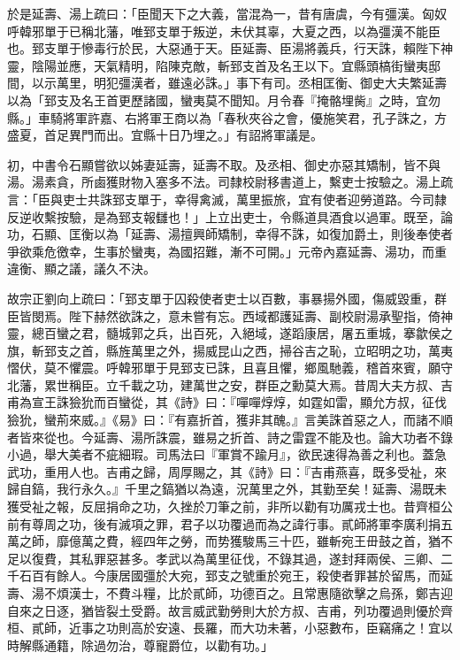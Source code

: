\begin{pinyinscope}
於是延壽、湯上疏曰：「臣聞天下之大義，當混為一，昔有唐虞，今有彊漢。匈奴呼韓邪單于已稱北藩，唯郅支單于叛逆，未伏其辜，大夏之西，以為彊漢不能臣也。郅支單于慘毒行於民，大惡通于天。臣延壽、臣湯將義兵，行天誅，賴陛下神靈，陰陽並應，天氣精明，陷陳克敵，斬郅支首及名王以下。宜縣頭槁街蠻夷邸間，以示萬里，明犯彊漢者，雖遠必誅。」事下有司。丞相匡衡、御史大夫繁延壽以為「郅支及名王首更歷諸國，蠻夷莫不聞知。月令春『掩骼埋胔』之時，宜勿縣。」車騎將軍許嘉、右將軍王商以為「春秋夾谷之會，優施笑君，孔子誅之，方盛夏，首足異門而出。宜縣十日乃埋之。」有詔將軍議是。

初，中書令石顯嘗欲以姊妻延壽，延壽不取。及丞相、御史亦惡其矯制，皆不與湯。湯素貪，所鹵獲財物入塞多不法。司隸校尉移書道上，繫吏士按驗之。湯上疏言：「臣與吏士共誅郅支單于，幸得禽滅，萬里振旅，宜有使者迎勞道路。今司隸反逆收繫按驗，是為郅支報讎也！」上立出吏士，令縣道具酒食以過軍。既至，論功，石顯、匡衡以為「延壽、湯擅興師矯制，幸得不誅，如復加爵土，則後奉使者爭欲乘危徼幸，生事於蠻夷，為國招難，漸不可開。」元帝內嘉延壽、湯功，而重違衡、顯之議，議久不決。

故宗正劉向上疏曰：「郅支單于囚殺使者吏士以百數，事暴揚外國，傷威毀重，群臣皆閔焉。陛下赫然欲誅之，意未嘗有忘。西域都護延壽、副校尉湯承聖指，倚神靈，總百蠻之君，髓城郭之兵，出百死，入絕域，遂蹈康居，屠五重城，搴歙侯之旗，斬郅支之首，縣旌萬里之外，揚威昆山之西，掃谷吉之恥，立昭明之功，萬夷慴伏，莫不懼震。呼韓邪單于見郅支已誅，且喜且懼，鄉風馳義，稽首來賓，願守北藩，累世稱臣。立千載之功，建萬世之安，群臣之勳莫大焉。昔周大夫方叔、吉甫為宣王誅獫狁而百蠻從，其《詩》曰：『嘽嘽焞焞，如霆如雷，顯允方叔，征伐獫狁，蠻荊來威。』《易》曰：『有嘉折首，獲非其醜。』言美誅首惡之人，而諸不順者皆來從也。今延壽、湯所誅震，雖易之折首、詩之雷霆不能及也。論大功者不錄小過，舉大美者不疵細瑕。司馬法曰『軍賞不踰月』，欲民速得為善之利也。蓋急武功，重用人也。吉甫之歸，周厚賜之，其《詩》曰：『吉甫燕喜，既多受祉，來歸自鎬，我行永久。』千里之鎬猶以為遠，況萬里之外，其勤至矣！延壽、湯既未獲受祉之報，反屈捐命之功，久挫於刀筆之前，非所以勸有功厲戎士也。昔齊桓公前有尊周之功，後有滅項之罪，君子以功覆過而為之諱行事。貳師將軍李廣利捐五萬之師，靡億萬之費，經四年之勞，而势獲駿馬三十匹，雖斬宛王毌鼓之首，猶不足以復費，其私罪惡甚多。孝武以為萬里征伐，不錄其過，遂封拜兩侯、三卿、二千石百有餘人。今康居國彊於大宛，郅支之號重於宛王，殺使者罪甚於留馬，而延壽、湯不煩漢士，不費斗糧，比於貳師，功德百之。且常惠隨欲擊之烏孫，鄭吉迎自來之日逐，猶皆裂土受爵。故言威武勤勞則大於方叔、吉甫，列功覆過則優於齊桓、貳師，近事之功則高於安遠、長羅，而大功未著，小惡數布，臣竊痛之！宜以時解縣通籍，除過勿治，尊寵爵位，以勸有功。」


\end{pinyinscope}
